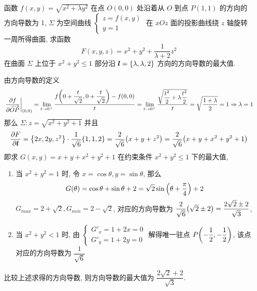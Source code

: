 \begin{example}
    函数 $f(x,y)=\sqrt{x^2+\lambda y^2}$ 在点 $O(0,0)$ 处沿着从 $O$ 到点 $P(1,1)$ 的方向的方向导数为 1, $\varSigma$ 为空间曲线 $\begin{cases}
        z=f(x,y) \\ y=1
    \end{cases}$ 在 $xOz$ 面的投影曲线绕 $z$ 轴旋转一周所得曲面, 求函数 $$
    F(x,y,z)=x^2+y^2+\dfrac{1}{\lambda+2}z^2
    $$
    在曲面 $\varSigma$ 上位于 $x^2+y^2\leqslant 1$ 部分沿 $\vb*{l}=\qty{\lambda,\lambda,2}$ 方向的方向导数的最大值.
\end{example}
\begin{solution}
    由方向导数的定义 $$
    \eval{\pdv{f}{\overrightarrow{OP} }}_{(0,0)}=\lim_{t \to 0^+}\dfrac{f\qty(0+\dfrac{t}{\sqrt{2}},0+\dfrac{t}{\sqrt{2}})-f(0,0)}{t}=\lim_{t \to 0^+}\dfrac{\sqrt{\dfrac{t^2}{2}+\lambda\dfrac{t^2}{2}}}{t}=\sqrt{\dfrac{1+\lambda}{2}}=1\Rightarrow \lambda=1
    $$
    那么 $\varSigma:z=\sqrt{x^2+y^2+1}$ 并且 $$
    \pdv{F}{\vb*{l}}=\qty{2x,2y,z^2}\cdot\dfrac{1}{\sqrt{6}}\qty{1,1,2}=\dfrac{2}{\sqrt{6}}\qty(x+y+z^2)=\dfrac{2}{\sqrt{6}}\qty(x+y+x^2+y^2+1)
    $$
    即求 $G(x,y)=x+y+x^2+y^2+1$ 在约束条件 $x^2+y^2\leqslant 1$ 下的最大值, 
    \begin{enumerate}[label=(\arabic{*})]
        \item 当 $x^2+y^2=1$ 时, 令 $x=\cos\theta, y=\sin\theta$, 那么 $$
        G(\theta)=\cos\theta+\sin\theta+2=\sqrt{2}\sin\qty(\theta+\dfrac{\pi}{4})+2
        $$
        $G_{max}=2+\sqrt{2}, G_{min}=2-\sqrt{2}$, 对应的方向导数为 $\dfrac{2}{\sqrt{6}}\qty(\sqrt{2}\pm 2)=\dfrac{2\sqrt{2}\pm 2}{\sqrt{3}}$,
        \item 当 $x^2+y^2<1$ 时, 由 $\begin{cases}
            G'_x=1+2x=0\\ G'_y=1+2y=0
        \end{cases}$ 解得唯一驻点 $P\qty(-\dfrac{1}{2},-\dfrac{1}{2})$, 该点对应的方向导数为 $\dfrac{1}{\sqrt{6}}$
    \end{enumerate}
    比较上述求得的方向导数, 则方向导数的最大值为 $\dfrac{2\sqrt{2}+2}{\sqrt{3}}.$
\end{solution}